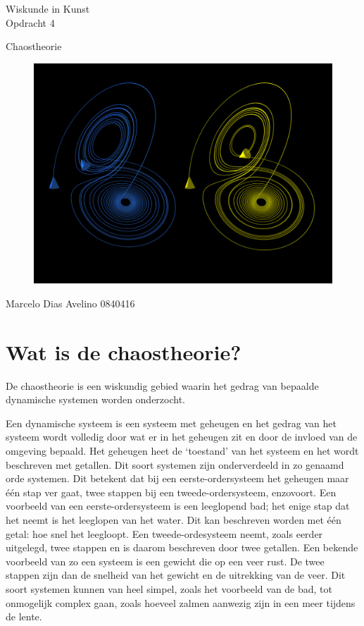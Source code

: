 \documentclass{article}
\begin{document}
\begin{center}
	\huge{Wiskunde in Kunst}\\
	\LARGE{Opdracht 4} \\
	
	\vspace{2cm}
	
	\Large{Chaostheorie}\\
	
	\vfill
	
	\begin{figure}[Hh]
		\centering
		\includegraphics[width=\textwidth]{TwoLorenzOrbits}
		\label{}
	\end{figure}
	
	\vfill
	\Large{Marcelo Dias Avelino} \hfill \large{0840416}
\end{center}

\pagebreak

\section{Wat is de chaostheorie?}

De chaostheorie is een wiskundig gebied waarin het gedrag van bepaalde dynamische systemen worden onderzocht. 

Een dynamische systeem is een systeem met geheugen en het gedrag van het systeem wordt volledig door wat er in het geheugen zit en door de invloed van de omgeving bepaald. Het geheugen heet de `toestand' van het systeem en het wordt beschreven met getallen. Dit soort systemen zijn onderverdeeld in zo genaamd orde systemen. Dit betekent dat bij een eerste-ordersysteem het geheugen maar \'e\'en stap ver gaat, twee stappen bij een tweede-ordersysteem, enzovoort. Een voorbeeld van een eerste-ordersysteem is een leeglopend bad; het enige stap dat het neemt is het leeglopen van het water. Dit kan beschreven worden met \'e\'en getal: hoe snel het leegloopt. Een tweede-ordesysteem neemt, zoals eerder uitgelegd, twee stappen en is daarom beschreven door twee getallen. Een bekende voorbeeld van zo een systeem is een gewicht die op een veer rust. De twee stappen zijn dan de snelheid van het gewicht en de uitrekking van de veer. Dit soort systemen kunnen van heel simpel, zoals het voorbeeld van de bad, tot onmogelijk complex gaan, zoals hoeveel zalmen aanwezig zijn in een meer tijdens de lente. 
\end{document}
